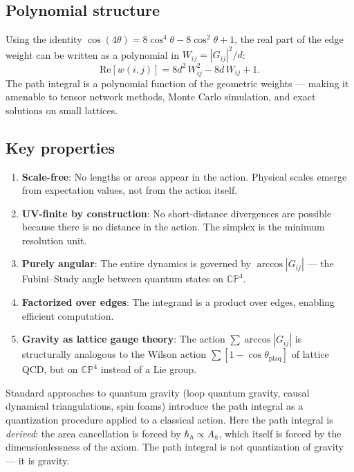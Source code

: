 \subsection{Polynomial structure}

Using the identity $\cos(4\theta) = 8\cos^4\theta - 8\cos^2\theta + 1$, the real part of the edge weight can be written as a polynomial in $W_{ij} = |G_{ij}|^2/d$:
\begin{equation}
\text{Re}[w(i,j)] = 8d^2\,W_{ij}^2 - 8d\,W_{ij} + 1.
\end{equation}
The path integral is a polynomial function of the geometric weights --- making it amenable to tensor network methods, Monte Carlo simulation, and exact solutions on small lattices.

\subsection{Key properties}

\begin{enumerate}
\item \textbf{Scale-free}: No lengths or areas appear in the action. Physical scales emerge from expectation values, not from the action itself.

\item \textbf{UV-finite by construction}: No short-distance divergences are possible because there is no distance in the action. The simplex is the minimum resolution unit.

\item \textbf{Purely angular}: The entire dynamics is governed by $\arccos|G_{ij}|$ --- the Fubini--Study angle between quantum states on $\mathbb{CP}^4$.

\item \textbf{Factorized over edges}: The integrand is a product over edges, enabling efficient computation.

\item \textbf{Gravity as lattice gauge theory}: The action $\sum\arccos|G_{ij}|$ is structurally analogous to the Wilson action $\sum[1 - \cos\theta_\text{plaq}]$ of lattice QCD, but on $\mathbb{CP}^4$ instead of a Lie group.
\end{enumerate}

\begin{remark}
Standard approaches to quantum gravity (loop quantum gravity, causal dynamical triangulations, spin foams) introduce the path integral as a quantization procedure applied to a classical action. Here the path integral is \emph{derived}: the area cancellation is forced by $\hbar_h \propto A_h$, which itself is forced by the dimensionlessness of the axiom. The path integral is not quantization of gravity --- it is gravity.
\end{remark}
